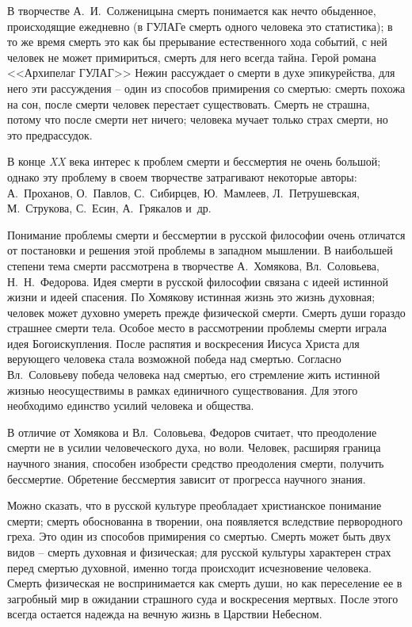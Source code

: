 \documentclass[pscyr,titlepage]{hedreport}
\begin{document}
  В творчестве А.~И.~Солженицына смерть понимается как нечто обыденное,
  происходящие ежедневно (в ГУЛАГе смерть одного человека это статистика); в то
  же время смерть это как бы прерывание естественного хода событий, с ней
  человек не может примириться, смерть для него всегда тайна. Герой романа
  <<Архипелаг ГУЛАГ>> Нежин рассуждает о смерти в духе эпикурейства, для него
  эти рассуждения – один из способов примирения со смертью: смерть похожа на
  сон, после смерти человек перестает существовать. Смерть не страшна, потому
  что после смерти нет ничего; человека мучает только страх смерти, но это
  предрассудок.

  В конце \emph{XX} века интерес к проблем смерти и бессмертия не очень большой;
  однако эту проблему в своем творчестве затрагивают некоторые авторы:
  А.~Проханов, О.~Павлов, С.~Сибирцев, Ю.~Мамлеев, Л.~Петрушевская, М.~Струкова,
  С.~Есин, А.~Грякалов и~др.

  Понимание проблемы смерти и бессмертии в русской философии очень отличатся от
  постановки и решения этой проблемы в западном мышлении. В наибольшей степени
  тема смерти рассмотрена в творчестве А.~Хомякова, Вл.~Соловьева,
  Н.~Н.~Федорова. Идея смерти в русской философии связана с идеей истинной жизни
  и идеей спасения. По Хомякову истинная жизнь это жизнь духовная; человек может
  духовно умереть прежде физической смерти. Смерть души гораздо страшнее смерти
  тела. Особое место в рассмотрении проблемы смерти играла идея Богоискупления.
  После распятия и воскресения Иисуса Христа для верующего человека стала
  возможной победа над смертью. Согласно Вл.~Соловьеву победа человека над
  смертью, его стремление жить истинной жизнью неосуществимы в рамках единичного
  существования. Для этого необходимо единство усилий человека и общества.

  В отличие от Хомякова и Вл.~Соловьева, Федоров считает, что преодоление смерти
  не в усилии человеческого духа, но воли. Человек, расширяя граница научного
  знания, способен изобрести средство преодоления смерти, получить бессмертие.
  Обретение бессмертия зависит от прогресса научного знания.

  Можно сказать, что в русской культуре преобладает христианское понимание
  смерти; смерть обоснованна в творении, она появляется вследствие первородного
  греха. Это один из способов примирения со смертью. Смерть может быть двух
  видов – смерть духовная и физическая; для русской культуры характерен страх
  перед смертью духовной, именно тогда происходит исчезновение человека. Смерть
  физическая не воспринимается как смерть души, но как переселение ее в
  загробный мир в ожидании страшного суда и воскресения мертвых. После этого
  всегда остается надежда на вечную жизнь в Царствии Небесном.
\end{document}
